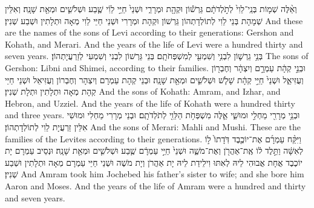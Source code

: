 {וְאֵ֨לֶּה שְׁמ֤וֹת בְּנֵֽי־לֵוִי֙ לְתֹ֣לְדֹתָ֔ם גֵּרְשׁ֕וֹן וּקְהָ֖ת וּמְרָרִ֑י וּשְׁנֵי֙ חַיֵּ֣י לֵוִ֔י שֶׁ֧בַע וּשְׁלֹשִׁ֛ים וּמְאַ֖ת שָׁנָֽה׃
}
{וְאִלֵּין שְׁמָהָת בְּנֵי לֵוִי לְתוֹלְדָתְהוֹן גֵּרְשׁוֹן וּקְהָת וּמְרָרִי וּשְׁנֵי חַיֵּי לֵוִי מְאָה וּתְלָתִין וּשְׁבַע שְׁנִין׃}
{And these are the names of the sons of Levi according to their generations: Gershon and Kohath, and Merari. And the years of the life of Levi were a hundred thirty and seven years.}{}
{בְּנֵ֥י גֵרְשׁ֛וֹן לִבְנִ֥י וְשִׁמְעִ֖י לְמִשְׁפְּחֹתָֽם׃}
{בְּנֵי גֵּרְשׁוֹן לִבְנִי וְשִׁמְעִי לְזַרְעֲיָתְהוֹן׃}
{The sons of Gershon: Libni and Shimei, according to their families.}{}
{וּבְנֵ֣י קְהָ֔ת עַמְרָ֣ם וְיִצְהָ֔ר וְחֶבְר֖וֹן וְעֻזִּיאֵ֑ל וּשְׁנֵי֙ חַיֵּ֣י קְהָ֔ת שָׁלֹ֧שׁ וּשְׁלֹשִׁ֛ים וּמְאַ֖ת שָׁנָֽה׃
}
{וּבְנֵי קְהָת עַמְרָם וְיִצְהָר וְחֶבְרוֹן וְעֻזִּיאֵל וּשְׁנֵי חַיֵּי קְהָת מְאָה וּתְלָתִין וּתְלָת שְׁנִין׃}
{And the sons of Kohath: Amram, and Izhar, and Hebron, and Uzziel. And the years of the life of Kohath were a hundred thirty and three years.}{}
{וּבְנֵ֥י מְרָרִ֖י מַחְלִ֣י וּמוּשִׁ֑י אֵ֛לֶּה מִשְׁפְּחֹ֥ת הַלֵּוִ֖י לְתֹלְדֹתָֽם׃}
{וּבְנֵי מְרָרִי מַחְלִי וּמוּשִׁי אִלֵּין זַרְעֲיָת לֵוִי לְתוֹלְדָתְהוֹן׃}
{And the sons of Merari: Mahli and Mushi. These are the families of the Levites according to their generations.}{}
{וַיִּקַּ֨ח עַמְרָ֜ם אֶת־יוֹכֶ֤בֶד דֹּֽדָתוֹ֙ ל֣וֹ לְאִשָּׁ֔ה וַתֵּ֣לֶד ל֔וֹ אֶֽת־אַהֲרֹ֖ן וְאֶת־מֹשֶׁ֑ה וּשְׁנֵי֙ חַיֵּ֣י עַמְרָ֔ם שֶׁ֧בַע וּשְׁלֹשִׁ֛ים וּמְאַ֖ת שָׁנָֽה׃
}
{וּנְסֵיב עַמְרָם יָת יוֹכֶבֶד אֲחָת אֲבוּהִי לֵיהּ לְאִתּוּ וִילֵידַת לֵיהּ יָת אַהֲרֹן וְיָת מֹשֶׁה וּשְׁנֵי חַיֵּי עַמְרָם מְאָה וּתְלָתִין וּשְׁבַע שְׁנִין׃}
{And Amram took him Jochebed his father’s sister to wife; and she bore him Aaron and Moses. And the years of the life of Amram were a hundred and thirty and seven years.}{}
